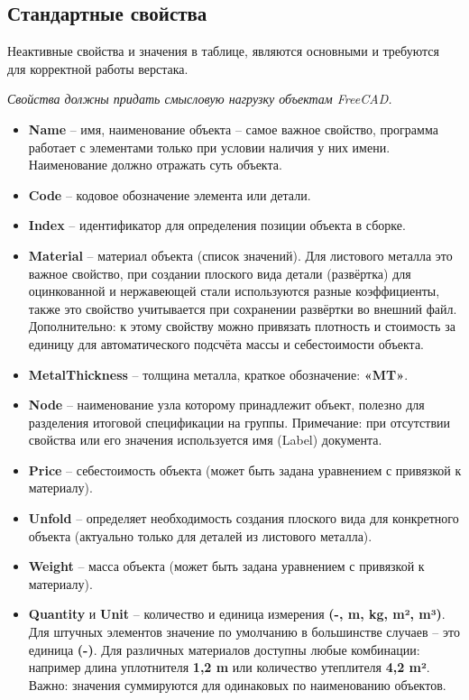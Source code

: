 \documentclass[a4paper,12pt]{article}
\begin{document}
\subsection{Стандартные свойства}

Неактивные свойства и значения в таблице, являются основными и требуются для корректной работы верстака.

\begin{center}\emph{Свойства должны придать смысловую нагрузку объектам FreeCAD.}\end{center}

\begin{itemize}
	\item \textbf{Name} -- имя, наименование объекта -- самое важное свойство, программа работает с элементами только при условии наличия у них имени. Наименование должно отражать суть объекта.
	\item \textbf{Code} -- кодовое обозначение элемента или детали.
	\item \textbf{Index} -- идентификатор для определения позиции объекта в сборке.
	\item \textbf{Material} -- материал объекта (список значений). Для листового металла это важное свойство, при создании плоского вида детали (развёртка) для оцинкованной и нержавеющей стали используются разные коэффициенты, также это свойство учитывается при сохранении развёртки во внешний файл. Дополнительно: к этому свойству можно привязать плотность и стоимость за единицу для автоматического подсчёта массы и себестоимости объекта.
	\item \textbf{MetalThickness} -- толщина металла, краткое обозначение: \textbf{«MT»}.
	\item \textbf{Node} -- наименование узла которому принадлежит объект, полезно для разделения итоговой спецификации на группы. Примечание: при отсутствии свойства или его значения используется имя (Label) документа.
	\item \textbf{Price} -- себестоимость объекта (может быть задана уравнением с привязкой к материалу).
	\item \textbf{Unfold} -- определяет необходимость создания плоского вида для конкретного объекта (актуально только для деталей из листового металла).
	\item \textbf{Weight} -- масса объекта (может быть задана уравнением с привязкой к материалу).
	\item \textbf{Quantity} и \textbf{Unit} -- количество и единица измерения \textbf{(-, m, kg, m², m³)}. Для штучных элементов значение по умолчанию в большинстве случаев -- это единица \textbf{(-)}. Для различных материалов доступны любые комбинации: например длина уплотнителя \textbf{1,2 m} или количество утеплителя \textbf{4,2 m²}. Важно: значения суммируются для одинаковых по наименованию объектов.
\end{itemize}
\end{document}
